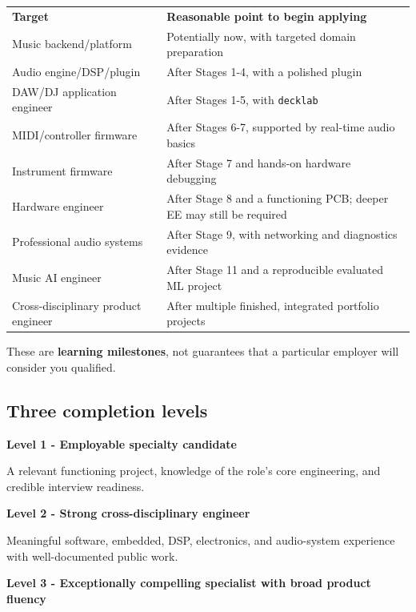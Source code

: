 \documentclass[11pt,letterpaper]{article}
\begin{document}
\begin{center}
\small
\begin{tabular}{>{\raggedright\arraybackslash}p{}>{\raggedright\arraybackslash}p{}}
\textbf{Target} & \textbf{Reasonable point to begin applying} \\
Music backend/platform & Potentially now, with targeted domain preparation \\
Audio engine/DSP/plugin & After Stages 1-4, with a polished plugin \\
DAW/DJ application engineer & After Stages 1-5, with \texttt{decklab} \\
MIDI/controller firmware & After Stages 6-7, supported by real-time audio basics \\
Instrument firmware & After Stage 7 and hands-on hardware debugging \\
Hardware engineer & After Stage 8 and a functioning PCB; deeper EE may still be required \\
Professional audio systems & After Stage 9, with networking and diagnostics evidence \\
Music AI engineer & After Stage 11 and a reproducible evaluated ML project \\
Cross-disciplinary product engineer & After multiple finished, integrated portfolio projects \\
\end{tabular}
\end{center}

These are \textbf{learning milestones}, not guarantees that a particular employer will consider you qualified.

\subsection*{Three completion levels}\label{three-completion-levels}

\textbf{Level 1 - Employable specialty candidate}

A relevant functioning project, knowledge of the role's core engineering, and credible interview readiness.

\textbf{Level 2 - Strong cross-disciplinary engineer}

Meaningful software, embedded, DSP, electronics, and audio-system experience with well-documented public work.

\textbf{Level 3 - Exceptionally compelling specialist with broad product fluency}
\end{document}
